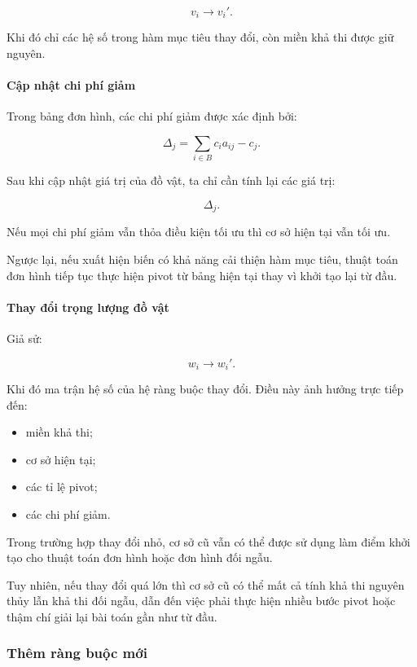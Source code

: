 \documentclass[fontsize=13pt,a4paper]{report}
\begin{document}
\[
v_i \rightarrow v_i'.
\]

Khi đó chỉ các hệ số trong hàm mục tiêu thay đổi, còn miền khả thi được giữ nguyên.

\paragraph{Cập nhật chi phí giảm}

Trong bảng đơn hình, các chi phí giảm được xác định bởi:

\[
\Delta_j = \sum_{i\in B} c_i a_{ij} - c_j.
\]

Sau khi cập nhật giá trị của đồ vật, ta chỉ cần tính lại các giá trị:

\[
\Delta_j.
\]

Nếu mọi chi phí giảm vẫn thỏa điều kiện tối ưu thì cơ sở hiện tại vẫn tối ưu.

Ngược lại, nếu xuất hiện biến có khả năng cải thiện hàm mục tiêu, thuật toán đơn hình tiếp tục thực hiện pivot từ bảng hiện tại thay vì khởi tạo lại từ đầu.

\paragraph{Thay đổi trọng lượng đồ vật}

Giả sử:

\[
w_i \rightarrow w_i'.
\]

Khi đó ma trận hệ số của hệ ràng buộc thay đổi. Điều này ảnh hưởng trực tiếp đến:

\begin{itemize}
    \item miền khả thi;
    \item cơ sở hiện tại;
    \item các tỉ lệ pivot;
    \item các chi phí giảm.
\end{itemize}

Trong trường hợp thay đổi nhỏ, cơ sở cũ vẫn có thể được sử dụng làm điểm khởi tạo cho thuật toán đơn hình hoặc đơn hình đối ngẫu.

Tuy nhiên, nếu thay đổi quá lớn thì cơ sở cũ có thể mất cả tính khả thi nguyên thủy lẫn khả thi đối ngẫu, dẫn đến việc phải thực hiện nhiều bước pivot hoặc thậm chí giải lại bài toán gần như từ đầu.

\subsubsection{Thêm ràng buộc mới}
\end{document}
